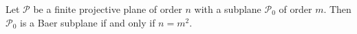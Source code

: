 Let $\mathcal{P}$ be a finite projective plane of order $n$ with a subplane $\mathcal{P}_0$ of order $m$. Then $\mathcal{P}_0$ is a Baer subplane if and only if $n = m^2$.
